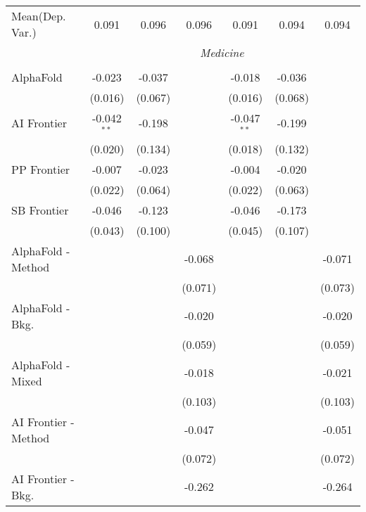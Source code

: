 \begin{tabular}{lcccccc}
Mean(Dep. Var.) & 0.091 & 0.096 & 0.096 & 0.091 & 0.094 & 0.094 \\
 & \multicolumn{6}{c}{\textit{Medicine}} \\ \\
   AlphaFold            & -0.023        & -0.037  &               & -0.018        & -0.036  &   \\   
                        & (0.016)       & (0.067) &               & (0.016)       & (0.068) &   \\   
   AI Frontier          & -0.042$^{**}$ & -0.198  &               & -0.047$^{**}$ & -0.199  &   \\   
                        & (0.020)       & (0.134) &               & (0.018)       & (0.132) &   \\   
   PP Frontier          & -0.007        & -0.023  &               & -0.004        & -0.020  &   \\   
                        & (0.022)       & (0.064) &               & (0.022)       & (0.063) &   \\   
   SB Frontier          & -0.046        & -0.123  &               & -0.046        & -0.173  &   \\   
                        & (0.043)       & (0.100) &               & (0.045)       & (0.107) &   \\   
   AlphaFold - Method   &               &         & -0.068        &               &         & -0.071\\   
                        &               &         & (0.071)       &               &         & (0.073)\\   
   AlphaFold - Bkg.     &               &         & -0.020        &               &         & -0.020\\   
                        &               &         & (0.059)       &               &         & (0.059)\\   
   AlphaFold - Mixed    &               &         & -0.018        &               &         & -0.021\\   
                        &               &         & (0.103)       &               &         & (0.103)\\   
   AI Frontier - Method &               &         & -0.047        &               &         & -0.051\\   
                        &               &         & (0.072)       &               &         & (0.072)\\   
   AI Frontier - Bkg.   &               &         & -0.262        &               &         & -0.264\\   

\end{tabular}
